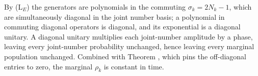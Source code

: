 By (L$_E$) the generators are polynomials in the commuting $\sigma_k = 2N_k - 1$, which are simultaneously diagonal in the joint number basis; a polynomial in commuting diagonal operators is diagonal, and its exponential is a diagonal unitary. A diagonal unitary multiplies each joint-number amplitude by a phase, leaving every joint-number probability unchanged, hence leaving every marginal population unchanged. Combined with Theorem , which pins the off-diagonal entries to zero, the marginal $\rho_k$ is constant in time.
